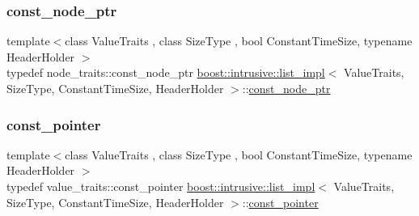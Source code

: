 \mbox{\label{classboost_1_1intrusive_1_1list__impl_a1bdb914613818a3acb6866cdba10ff09}} 
\subsubsection{\texorpdfstring{const\+\_\+node\+\_\+ptr}{const\_node\_ptr}}
{\footnotesize\ttfamily template$<$class Value\+Traits , class Size\+Type , bool Constant\+Time\+Size, typename Header\+Holder $>$ \\
typedef node\+\_\+traits\+::const\+\_\+node\+\_\+ptr \hyperlink{classboost_1_1intrusive_1_1list__impl}{boost\+::intrusive\+::list\+\_\+impl}$<$ Value\+Traits, Size\+Type, Constant\+Time\+Size, Header\+Holder $>$\+::\hyperlink{classboost_1_1intrusive_1_1list__impl_a1bdb914613818a3acb6866cdba10ff09}{const\+\_\+node\+\_\+ptr}}

\mbox{\label{classboost_1_1intrusive_1_1list__impl_abc0f6e1c4c5f44b9edd5b96e798a618c}} 
\subsubsection{\texorpdfstring{const\+\_\+pointer}{const\_pointer}}
{\footnotesize\ttfamily template$<$class Value\+Traits , class Size\+Type , bool Constant\+Time\+Size, typename Header\+Holder $>$ \\
typedef value\+\_\+traits\+::const\+\_\+pointer \hyperlink{classboost_1_1intrusive_1_1list__impl}{boost\+::intrusive\+::list\+\_\+impl}$<$ Value\+Traits, Size\+Type, Constant\+Time\+Size, Header\+Holder $>$\+::\hyperlink{classboost_1_1intrusive_1_1list__impl_abc0f6e1c4c5f44b9edd5b96e798a618c}{const\+\_\+pointer}}

\mbox{\label{classboost_1_1intrusive_1_1list__impl_a3d37629151c76fb8389ac3ba3b359201}} 
